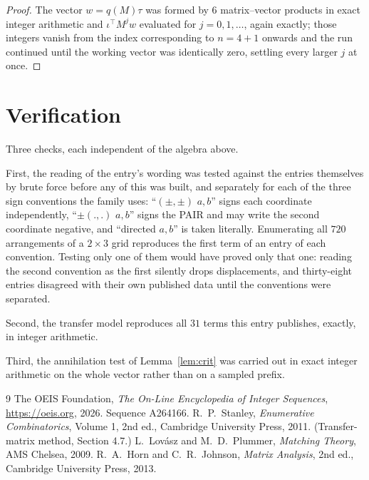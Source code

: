 \documentclass[11pt,a4paper]{article}
\theoremstyle{plain}
\theoremstyle{definition}
\begin{document}
\begin{proof}
The vector $w=q(M)\tau$ was formed by $6$ matrix--vector products in exact integer
arithmetic and $\iota^{\!\top}M^{j}w$ evaluated for $j=0,1,\dots$, again exactly; those
integers vanish from the index corresponding to $n=4+1$ onwards and the run continued
until the working vector was identically zero, settling every larger $j$ at once.
\end{proof}

\section{Verification}

Three checks, each independent of the algebra above.

First, the reading of the entry's wording was tested against the entries themselves by brute
force before any of this was built, and separately for each of the three sign conventions the
family uses: ``$(\pm,\pm)$ $a,b$'' signs each coordinate independently, ``$\pm(.,.)$ $a,b$''
signs the PAIR and may write the second coordinate negative, and ``directed $a,b$'' is taken
literally. Enumerating all $720$ arrangements of a $2\times3$ grid reproduces the first term
of an entry of each convention. Testing only one of them would have proved only that one:
reading the second convention as the first silently drops displacements, and thirty-eight
entries disagreed with their own published data until the conventions were separated.

Second, the transfer model reproduces all $31$ terms this entry publishes, exactly, in
integer arithmetic.

Third, the annihilation test of Lemma~\ref{lem:crit} was carried out in exact integer
arithmetic on the whole vector rather than on a sampled prefix.

\begin{thebibliography}{9}
 The OEIS Foundation, \emph{The On-Line Encyclopedia of Integer
Sequences}, \url{https://oeis.org}, 2026. Sequence A264166.
 R.~P.~Stanley, \emph{Enumerative Combinatorics}, Volume 1, 2nd ed.,
Cambridge University Press, 2011. (Transfer-matrix method, Section 4.7.)
 L.~Lov\'asz and M.~D.~Plummer, \emph{Matching Theory}, AMS Chelsea, 2009.
 R.~A.~Horn and C.~R.~Johnson, \emph{Matrix Analysis}, 2nd ed., Cambridge
University Press, 2013.
\end{thebibliography}
\end{document}
